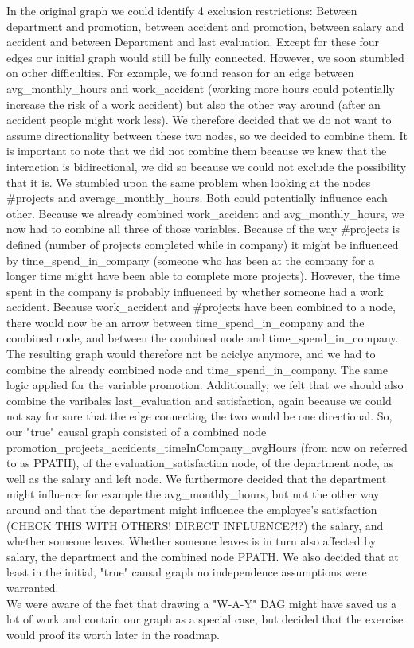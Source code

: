 \documentclass[11pt]{article} %
\begin{document}
\begin{enumerate}
 In the original graph we could identify 4 exclusion restrictions: Between department and promotion, between accident and promotion, between salary and accident and between Department and last evaluation. Except for these four edges our initial graph would still be fully connected. However, we soon stumbled on other difficulties. For example, we found reason for an edge between avg\_monthly\_hours and work\_accident (working more hours could potentially increase the risk of a work accident) but also the other way around (after an accident people might work less). We therefore decided that we do not want to assume directionality between these two nodes, so we decided to combine them. It is important to note that we did not combine them because we knew that the interaction is bidirectional, we did so because we could not exclude the possibility that it is. We stumbled upon the same problem when looking at the nodes \#projects and average\_monthly\_hours. Both could potentially influence each other. Because we already combined work\_accident and avg\_monthly\_hours, we now had to combine all three of those variables. Because of the way \#projects is defined (number of projects completed while in company) it might be influenced by time\_spend\_in\_company (someone who has been at the company for a longer time might have been able to complete more projects). However, the time spent in the company is probably influenced by whether someone had a work accident. Because work\_accident and \#projects have been combined to a node, there would now be an arrow between time\_spend\_in\_company and the combined node, and between the combined node and time\_spend\_in\_company. The resulting graph would therefore not be aciclyc anymore, and we had to combine the already combined node and time\_spend\_in\_company.  The same logic applied for the variable promotion. Additionally, we felt that we should also combine the varibales last\_evaluation and satisfaction, again because we could not say for sure that the edge connecting the two would be one directional. So, our "true" causal graph consisted of a combined node promotion\_projects\_accidents\_timeInCompany\_avgHours (from now on referred to as PPATH), of the evaluation\_satisfaction node, of the department node, as well as the salary and left node. We furthermore decided that the department might influence for example the avg\_monthly\_hours, but not the other way around and that the department might influence the employee's satisfaction (CHECK THIS WITH OTHERS! DIRECT INFLUENCE?!?) the salary, and whether someone leaves. Whether someone leaves is in turn also affected by salary, the department and the combined node PPATH. We also decided that at least in the initial, "true" causal graph no independence assumptions were warranted.\\ 
We were aware of the fact that drawing a "W-A-Y" DAG might have saved us a lot of work and contain our graph as a special case, but decided that the exercise would proof its worth later in the roadmap. \\


\end{enumerate}
\end{document}
